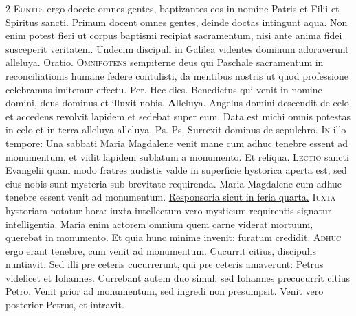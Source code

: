 \begin{multicols*}{2}
\lettrine[lines=2]{\zallmancaps \color{Red} E}{untes} ergo docete omnes gentes, baptizantes eos in nomine Patris et Filii et Spiritus sancti. Primum docent omnes gentes, deinde doctas intingunt aqua. Non enim potest fieri ut corpus baptismi recipiat sacramentum, nisi ante anima fidei susceperit veritatem.
 Undecim discipuli in Galilea videntes dominum adoraverunt alleluya. {\color{Red} Oratio.}
\lettrine[lines=2]{\zallmancaps \color{Blue} O}{mnipotens} sempiterne deus qui Paschale sacramentum in reconciliationis humane federe contulisti, da mentibus nostris ut quod professione celebramus imitemur effectu. Per.
 \R Hec dies. \V Benedictus qui venit in nomine domini, deus dominus et illuxit nobis. {\color{Red} \bfseries A}lleluya. \V Angelus domini descendit de celo et accedens revolvit lapidem et sedebat super eum.
 Data est michi omnis potestas in celo et in terra alleluya alleluya.
  {\color{Red} Ps.}  {\color{Red} Ps.}  \V Surrexit dominus de sepulchro.
\lettrine[lines=2]{\zallmancaps \color{Red} I}{n} illo tempore: Una sabbati Maria Magdalene venit mane cum adhuc tenebre essent ad monumentum, et vidit lapidem sublatum a monumento. Et reliqua.
 \grecross
\lettrine[lines=2]{\zallmancaps \color{Blue} L}{ectio} sancti Evangelii quam modo fratres audistis valde in superficie hystorica aperta est, sed eius nobis sunt mysteria sub brevitate requirenda. Maria Magdalene cum adhuc tenebre essent venit ad monumentum. \ul{Responsoria sicut in feria quarta.}
\lettrine[lines=2]{\zallmancaps \color{Red} I}{uxta} hystoriam notatur hora: iuxta intellectum vero mysticum requirentis signatur intelligentia. Maria enim actorem omnium quem carne viderat mortuum, querebat in monumento. Et quia hunc minime invenit: furatum credidit.
\lettrine[lines=2]{\zallmancaps \color{Blue} A}{dhuc} ergo erant tenebre, cum venit ad monumentum. Cucurrit citius, discipulis nuntiavit. Sed illi pre ceteris cucurrerunt, qui pre ceteris amaverunt: Petrus videlicet et Iohannes. Currebant autem duo simul: sed Iohannes precucurrit citius Petro. Venit prior ad monumentum, sed ingredi non presumpsit. Venit vero posterior Petrus, et intravit.

\end{multicols*}
